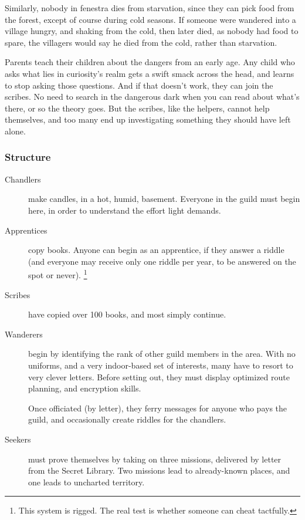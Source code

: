 \begin{multicols}{2}
{Similarly, nobody in \gls{fenestra} dies from starvation, since they can pick food from the forest, except of course during cold seasons.
If someone were wandered into a village hungry, and shaking from the cold, then later died, as nobody had food to spare, the villagers would say he died from the cold, rather than starvation.}

Parents teach their children about the dangers from an early age.
Any child who asks what lies in curiosity's realm gets a swift smack across the head, and learns to stop asking those questions.
And if that doesn't work, they can join the scribes.
No need to search in the dangerous dark when you can read about what's there, or so the theory goes.
But the scribes, like the helpers, cannot help themselves, and too many end up investigating something they should have left alone.

\subsubsection{Structure}

\begin{description}
  \item[Chandlers]
  make candles, in a hot, humid, basement.
  Everyone in the guild must begin here, in order to understand the effort light demands.
  \item[Apprentices]
  copy books.
  Anyone can begin as an apprentice, if they answer a riddle (and everyone may receive only one riddle per year, to be answered on the spot or never).%
  \footnote{This system is rigged. The real test is whether someone can cheat tactfully.}
  \item[Scribes]
  have copied over 100 books, and most simply continue.
  \item[Wanderers]
  \label{knowledgeWanderer}%
  begin by identifying the rank of other guild members in the area.
  With no uniforms, and a very indoor-based set of interests, many have to resort to very clever letters.
  Before setting out, they must display optimized route planning, and encryption skills.

  Once officiated (by letter), they ferry messages for anyone who pays the guild, and occasionally create riddles for the chandlers.
  \item[Seekers]
  must prove themselves by taking on three missions, delivered by letter from the Secret Library.
  Two missions lead to already-known places, and one leads to uncharted territory.


\end{description}
\end{multicols}
